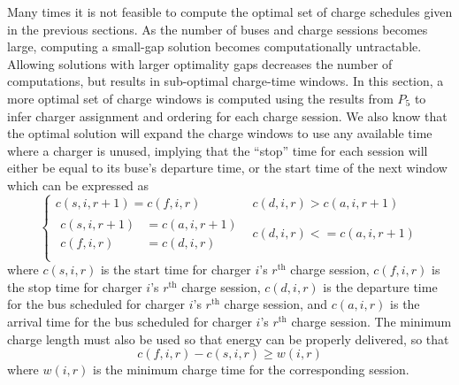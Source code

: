 Many times it is not feasible to compute the optimal set of charge schedules given in the previous sections. As the number of buses and charge sessions becomes large, computing a small-gap solution becomes computationally untractable. Allowing solutions with larger optimality gaps decreases the number of computations, but results in sub-optimal charge-time windows.  In this section, a more optimal set of charge windows is computed using the results from $P_5$ to infer charger assignment and ordering for each charge session. We also know that the optimal solution will expand the charge windows to use any available time where a charger is unused, implying that the ``stop'' time for each session will either be equal to its buse's departure time, or the start time of the next window which can be expressed as
\begin{equation}\label{eqn:optChargeSchedules:eqn1}
\begin{cases}
	c(s,i,r+1) = c(f,i,r) & c(d,i,r) > c(a,i,r+1)\\[0.08in]
	\begin{aligned}
	c(s,i,r+1) &= c(a,i,r+1) \\
	c(f,i,r) &= c(d,i,r)
	\end{aligned} & c(d,i,r) <= c(a,i,r+1) \\
\end{cases}
\end{equation}
where $c(s,i,r)$ is the start time for charger $i$'s $r^{\text{th}}$ charge session, $c(f,i,r)$ is the stop time for charger $i$'s $r^{\text{th}}$ charge session, $c(d,i,r)$ is the departure time for the bus scheduled for charger $i$'s $r^{\text{th}}$ charge session, and $c(a,i,r)$ is the arrival time for the bus scheduled for charger $i$'s $r^{\text{th}}$ charge session. 
The minimum charge length must also be used so that energy can be properly delivered, so that
\begin{equation}\label{eqn:optChargeSchedules:eqn2}
	c(f,i,r) - c(s,i,r) \ge w(i,r)
\end{equation}
where $w(i,r)$ is the minimum charge time for the corresponding session.

